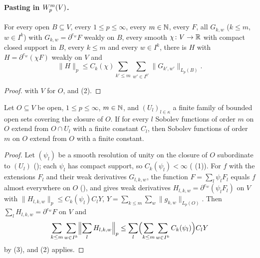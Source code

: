 \paragraph{Pasting in $W^{m}_{p}(V)$.}

\begin{lemma}
\label{lem:leibniz-pasting}
\leanok
{}
For every open $B \subseteq V$, every $1 \leq p \leq \infty$, every $m \in \mathbb{N}$, every $F$, all
$G_{k,w}$ ($k \leq m$, $w \in I^k$) with $G_{k,w} = \partial^{e_w} F$ weakly on $B$, every smooth
$\chi \colon V \to \mathbb{R}$ with compact closed support in $B$, every $k \leq m$ and every
$w \in I^k$, there is $H$ with $H = \partial^{e_w} (\chi F)$ weakly on $V$ and
\[
  \|H\|_p \leq C_k(\chi) \sum_{k' \leq m} \sum_{w' \in I^{k'}} \|G_{k',w'}\|_{L_p(B)} .
\]
\end{lemma}

\begin{proof}
\leanok
{} with $V$ for $O$, and  (2).
\end{proof}

\begin{theorem}
\label{thm:pasting-sobolev-higher}
\leanok
{}
Let $O \subseteq V$ be open, $1 \leq p \leq \infty$, $m \in \mathbb{N}$, and $(U_l)_{l \in \kappa}$ a
finite family of bounded open sets covering the closure of $O$. If for every $l$ Sobolev
functions of order $m$ on $O$ extend from $O \cap U_l$ with a finite constant $C_l$, then
Sobolev functions of order $m$ on $O$ extend from $O$ with a finite constant.
\end{theorem}

\begin{proof}
\leanok
Let $(\psi_l)$ be a smooth resolution of unity on the closure of $O$ subordinate to $(U_l)$
(); each $\psi_l$ has compact support, so $C_k(\psi_l) < \infty$
( (1)). For $f$ with the extensions $F_l$ and their weak derivatives
$G_{l,k,w}$, the function $F = \sum_l \psi_l F_l$ equals $f$ almost everywhere on $O$
(), and  gives weak derivatives
$H_{l,k,w} = \partial^{e_w} (\psi_l F_l)$ on $V$ with
$\|H_{l,k,w}\|_p \leq C_k(\psi_l) C_l Y$, $Y = \sum_{k \leq m} \sum_w \|g_{k,w}\|_{L_p(O)}$.
Then $\sum_l H_{l,k,w} = \partial^{e_w} F$ on $V$ and
\[
  \sum_{k \leq m} \sum_{w \in I^k} \Bigl\|\sum_l H_{l,k,w}\Bigr\|_p \leq \sum_l \Bigl(\sum_{k
  \leq m} \sum_{w \in I^k} C_k(\psi_l)\Bigr) C_l Y
\]
by  (3), and  (2) applies.
\end{proof}

